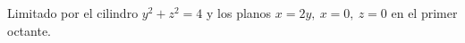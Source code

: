 \item Limitado por el cilindro $y^2 + z^2 = 4$ y los planos $x = 2y, \ x = 0, \ z = 0$ en el primer octante.
